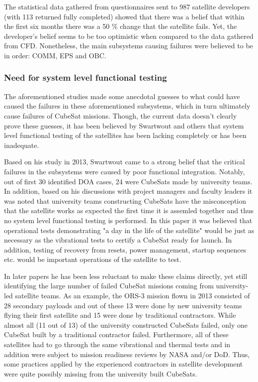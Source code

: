 \documentclass[english,12pt,a4paper,pdftex,elec,utf8]{aaltothesis}
\begin{document}
The statistical data gathered from questionnaires sent to 987 satellite developers (with 113 returned fully completed) showed that there was a belief that within the first six months there was a 50 \% change that the satellite fails. Yet, the developer's belief seems to be too optimistic when compared to the data gathered from CFD. Nonetheless, the main subsystems causing failures were believed to be in order: COMM, EPS and OBC.\cite{Langer}\par
\subsubsection{Need for system level functional testing}
The aforementioned studies made some anecdotal guesses to what could have caused the failures in these aforementioned subsystems, which in turn ultimately cause failures of CubeSat missions. Though, the current data doesn't clearly prove these guesses, it has been believed by Swartwout and others that system level functional testing of the satellites has been lacking completely or has been inadequate. \cite{Swart1, Swart2016, Swart2015, Langer} \par
Based on his study in 2013, Swartwout came to a strong belief that the critical failures in the subsystems were caused by poor functional integration. Notably, out of first 30 identified DOA cases, 24 were CubeSats made by university teams. In addition, based on his discussions with project managers and faculty leaders it was noted that university teams constructing CubeSats have the misconception that the satellite works as expected the first time it is assemled together and thus no system level functional testing is performed. In this paper it was believed that operational tests demonstrating "a day in the life of the satellite" would be just as necessary as the vibrational tests to certify a CubeSat ready for launch. In addition, testing of recovery from resets, power management, startup sequences etc. would be important operations of the satellite to test. \cite{Swart1} \par
In later papers he has been less reluctant to make these claims directly, yet still identifying the large number of failed CubeSat missions coming from university-led satellite teams. As an example, the ORS-3 mission flown in 2013 consisted of 28 secondary payloads and out of these 13 were done by new university teams flying their first satellite and 15 were done by traditional contractors. While almost all (11 out of 13) of the university constructed CubeSats failed, only one CubeSat built by a traditional contractor failed. Furthermore, all of these satellites had to go through the same vibrational and thermal tests and in addition were subject to mission readiness reviews by NASA and/or DoD. Thus, some practices applied by the experienced contractors in satellite development were quite possibly missing from the university built CubeSats.  \cite{Swart2016, Swart2015, some ORS-3 source}\par
\end{document}
